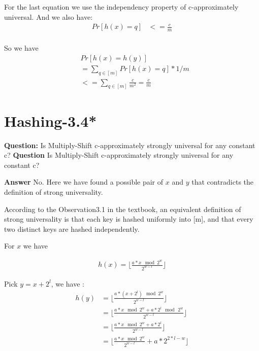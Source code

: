 \documentclass[12pt]{article}
\begin{document}
For the last equation we use the independency property of c-approximately universal. And we also have:
\begin{equation}
\begin{aligned}
Pr[h(x) = q] &<= \frac{c}{m} \\
\end{aligned}
\end{equation}

So we have
\begin{equation}
\begin{aligned}
&Pr[h(x)=h(y)] \\
&= \sum_{q \in [m]} Pr[h(x) = q] * 1/m\\
&<=\sum_{q \in [m]}   \frac{c}{m^2}
= \frac{c}{m}
\end{aligned}
\end{equation}

\section{Hashing-3.4*}
\textbf{Question:} Is Multiply-Shift c-approximately strongly universal for any constant c?
\textbf{Question} Is Multiply-Shift c-approximately strongly universal for any constant c?

\textbf{Answer}
No. Here we have found a possible pair of $x$ and $y$ that contradicts the definition of strong universality.

According to the Observation3.1 in the textbook, an equivalent definition of strong universality is that each key is hashed uniformly into [m], and that every two distinct keys are hashed independently.

For $x$ we have 

\begin{equation}
\begin{aligned}
h(x) = \lfloor \frac{a * x \mod 2^w}{2^{w-l}} \rfloor
\end{aligned}
\end{equation}

Pick $y=x+2^{l}$, we have :
\begin{equation}
\begin{aligned}
h(y) &= \lfloor \frac{a*(x+2^l)  \mod 2^w }{2^{w-l}} \rfloor \\
&= \lfloor \frac{a*x \mod 2^w + a * 2^l \mod \, 2^w }{2^{w-l}} \rfloor \\
&= \lfloor \frac{a*x \mod 2^w + a * 2^l }{2^{w-l}} \rfloor \\
&= \lfloor \frac{a*x \mod 2^w }{2^{w-l}}  + a * 2^{2*l-w} \rfloor \\
\end{aligned}
\end{equation}
\end{document}
